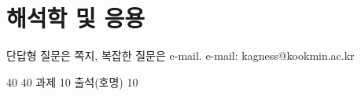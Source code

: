 \chapter{해석학 및 응용}

단답형 질문은 쪽지, 복잡한 질문은 e-mail.
e-mail: kagness@kookmin.ac.kr

40 40 과제 10 출석(호명) 10

